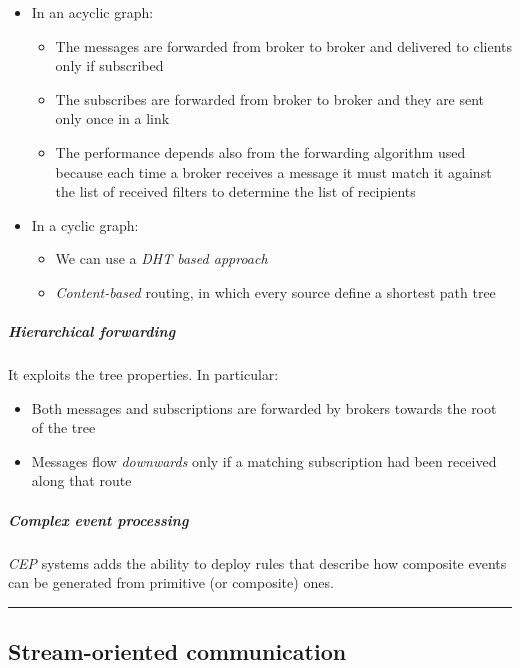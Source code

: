 \begin{itemize}
    \item In an acyclic graph:
        \begin{itemize}
            \item The messages are forwarded from broker to broker and delivered to clients only if subscribed
            \item The subscribes are forwarded from broker to broker and they are sent only once in a link
            \item The performance depends also from the forwarding algorithm used because each time a broker receives a message it   must match it against the list of received filters to determine the list of recipients
        \end{itemize}
    
    \item In a cyclic graph:
    \begin{itemize}
        \item We can use a \emph{DHT based approach}
        \item \emph{Content-based} routing, in which every source define a shortest path tree
    \end{itemize}
\end{itemize}

\subparagraph{Hierarchical forwarding}

It exploits the tree properties. In particular:
\begin{itemize}
    \item Both messages and subscriptions are forwarded by brokers towards the root of the tree
    \item Messages flow \textit{downwards} only if a matching subscription had been received along that route
\end{itemize}

\subparagraph{Complex event processing}
\textit{CEP} systems adds the ability to deploy rules that describe how composite events can be generated from primitive (or composite) ones.

\begin{center}\rule{3in}{0.4pt}\end{center}

\subsection{Stream-oriented communication}


